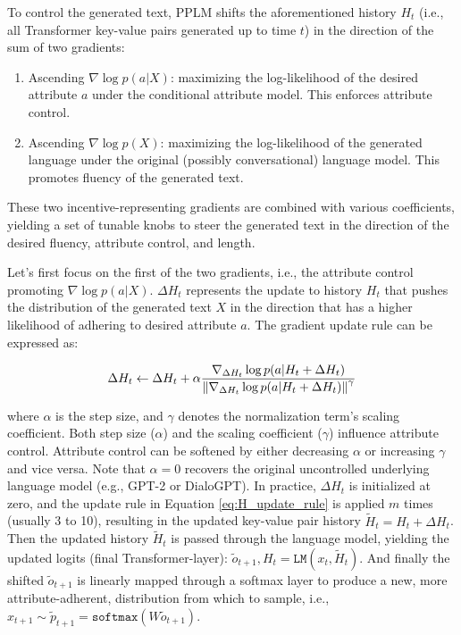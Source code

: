 To control the generated text, PPLM shifts the aforementioned history $H_t$ (i.e., all Transformer key-value pairs generated up to time $t$) in the direction of the sum of two gradients:

\begin{enumerate}
    \item Ascending $\nabla \log p(a | X)$: maximizing the log-likelihood of the desired attribute $a$ under the conditional attribute model. This enforces attribute control.
    \item Ascending $\nabla \log p(X)$: maximizing the log-likelihood of the generated language under the original (possibly conversational) language model. This promotes fluency of the generated text.
\end{enumerate}

These two incentive-representing gradients are combined with various coefficients, yielding a set of tunable knobs to steer the generated text in the direction of the desired fluency, attribute control, and length.

Let's first focus on the first of the two gradients, i.e., the attribute control promoting $\nabla \log p(a | X)$. $\Delta H_t$ represents the update to history $H_t$ that pushes the distribution of the generated text $X$ in the direction that has a higher likelihood of adhering to desired attribute $a$. The gradient update rule can be expressed as:

\begin{equation}
    \Delta H_t \leftarrow \Delta H_t + \alpha
    \frac{\nabla_{\Delta H_t} \log p(a | H_t + \Delta H_t)}
    {\norm{\nabla_{\Delta H_t} \log p(a | H_t + \Delta H_t)}^{\gamma}}
\label{eq:H_update_rule}
\end{equation}

where $\alpha$ is the step size, and $\gamma$ denotes the normalization term's scaling coefficient. Both step size ($\alpha$) and the scaling coefficient ($\gamma$) influence attribute control. Attribute control can be softened by either decreasing $\alpha$ or increasing $\gamma$ and vice versa. Note that $\alpha = 0$ recovers the original uncontrolled underlying language model (e.g., GPT-2 or DialoGPT). In practice, $\Delta H_t$ is initialized at zero, and the update rule in Equation \ref{eq:H_update_rule} is applied $m$ times (usually 3 to 10), resulting in the updated key-value pair history $\tilde{H}_t  = H_t + \Delta H_t$. Then the updated history $\tilde{H}_t$ is passed through the language model, yielding the updated logits (final Transformer-layer): $\tilde{o}_{t + 1}, H_t = \texttt{LM}(x_t, \tilde{H}_t)$. And finally the shifted $\tilde{o}_{t + 1}$ is linearly mapped through a softmax layer to produce a new, more attribute-adherent, distribution from which to sample, i.e., $x_{t + 1} \sim \tilde{p}_{t + 1} = \texttt{softmax} \left( W \tilde{o}_{t + 1} \right)$.

